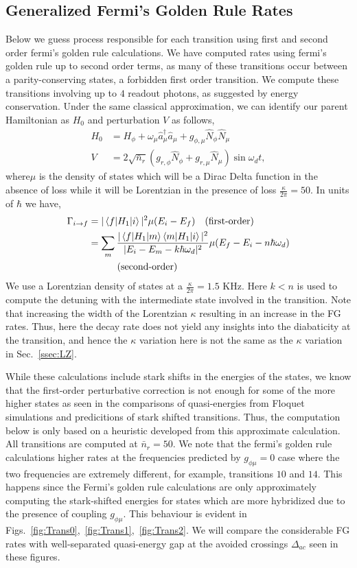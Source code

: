 \documentclass[prx,showpacs,notitlepage,twocolumn,superscriptaddress,nofootinbib,preprintnumbers,floatfix]{revtex4-2}
\begin{document}
\subsection{Generalized Fermi's Golden Rule Rates}\label{app:Floquet-trans}
Below we guess process responsible for each transition using first and second order fermi's golden rule calculations. We have computed rates using fermi's golden rule up to second order terms, as many of these transitions occur between a parity-conserving states, a forbidden first order transition. We compute these transitions involving up to $4$ readout photons, as suggested by energy conservation. 
Under the same classical approximation, we can identify our parent Hamiltonian as $H_0$ and perturbation $V$ as follows,
\begin{align}
H_0&=H_{\phi}+\omega_\mu \hat a_\mu^\dagger \hat a_\mu+g_{\phi,\mu}\hat N_\phi \hat N_\mu\\
V&=2\sqrt{\bar n_r}(g_{r,\phi} \hat N_\phi+g_{r,\mu}\hat N_\mu)\sin{\omega_d t},
\end{align}
where$\mu$ is the density of states which will be a Dirac Delta function in the absence of loss while it will be Lorentzian in the presence of loss $\frac{\kappa}{2\pi}=50$. In units of $\hbar$ we have,
\begin{align}
    \Gamma_{i\rightarrow f}&=|\braket{f|H_1|i}|^2\mu(E_i-E_f)\quad\textrm{(first-order)}\\
&=\sum_m\frac{|\braket{f|H_1|m}\braket{m|H_1|i}|^2}{|E_i-E_m-k\hbar\omega_d|^2}\mu(E_f-E_i-n\hbar \omega_d)\nonumber\\&\quad\quad\quad\textrm{(second-order)}
\end{align}
We use a Lorentzian density of states at a $\frac{\kappa}{2\pi}=1.5$ KHz. Here $k<n$ is used to compute the detuning with the intermediate state involved in the transition. Note that increasing the width of the Lorentzian $\kappa$ resulting in an increase in the FG rates. Thus, here the decay rate does not yield any insights into the diabaticity at the transition, and hence the $\kappa$ variation here is not the same as the $\kappa$ variation in Sec.~\ref{ssec:LZ}.

While these calculations include stark shifts in the energies of the states, we know that the first-order perturbative correction is not enough for some of the more higher states as seen in the comparisons of quasi-energies from Floquet simulations and predicitions of stark shifted transitions. Thus, the computation below is only based on a heuristic developed from this approximate calculation. All transitions are computed at $\bar n_r=50$. We note that the fermi's golden rule calculations higher rates at the frequencies predicted by $g_{\phi\mu}=0$ case where the two frequencies are extremely different, for example, transitions $10$ and $14$. This happens since the Fermi's golden rule calculations are only approximately computing the stark-shifted energies for states which are more hybridized due to the presence of coupling $g_{\phi\mu}$. This behaviour is evident in Figs.~\ref{fig:Trans0},~\ref{fig:Trans1},~\ref{fig:Trans2}. We will compare the considerable FG rates with well-separated quasi-energy gap at the avoided crossings  $\Delta_{ac}$ seen in these figures.
\end{document}
